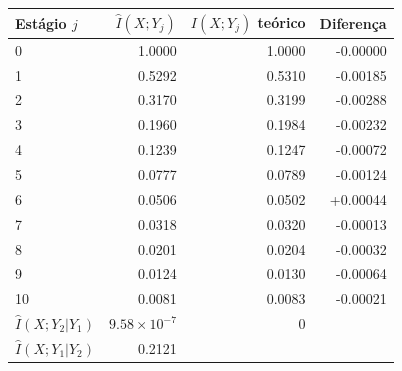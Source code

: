 \begin{tabular}{lrrr}
\toprule
Estágio $j$ & $\hat I(X;Y_j)$ & $I(X;Y_j)$ teórico & Diferença \\
\midrule
0 & 1.0000 & 1.0000 & -0.00000 \\
1 & 0.5292 & 0.5310 & -0.00185 \\
2 & 0.3170 & 0.3199 & -0.00288 \\
3 & 0.1960 & 0.1984 & -0.00232 \\
4 & 0.1239 & 0.1247 & -0.00072 \\
5 & 0.0777 & 0.0789 & -0.00124 \\
6 & 0.0506 & 0.0502 & +0.00044 \\
7 & 0.0318 & 0.0320 & -0.00013 \\
8 & 0.0201 & 0.0204 & -0.00032 \\
9 & 0.0124 & 0.0130 & -0.00064 \\
10 & 0.0081 & 0.0083 & -0.00021 \\
$\hat I(X;Y_2|Y_1)$ & $9.58\times 10^{-7}$ & 0 &  \\
$\hat I(X;Y_1|Y_2)$ & 0.2121 &  &  \\
\bottomrule
\end{tabular}
